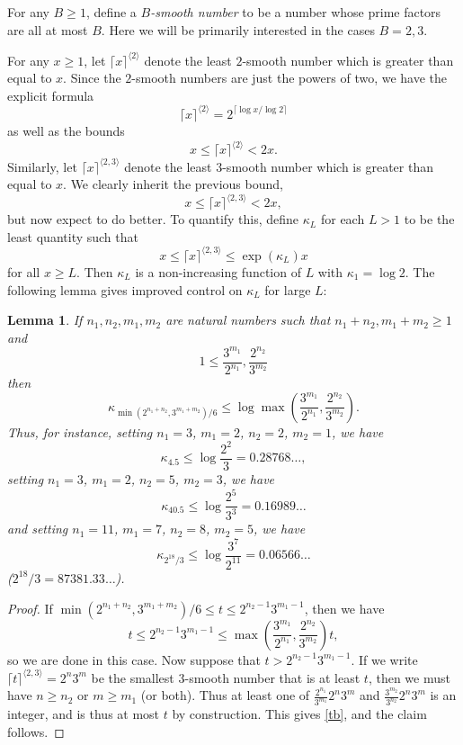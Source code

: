 \documentclass[12pt,a4paper,reqno]{amsart}
\numberwithin{equation}{section}
\theoremstyle{plain}
\newtheorem{lemma}[theorem]{Lemma}
\theoremstyle{definition}
\begin{document}
For any $B \geq 1$, define a \emph{$B$-smooth number} to be a number whose prime factors are all at most $B$.  Here we will be primarily interested in the cases $B=2,3$.

For any $x \geq 1$, let $\lceil x \rceil^{\langle 2\rangle}$ denote the least $2$-smooth number which is greater than equal to $x$.  Since the $2$-smooth numbers are just the powers of two, we have the explicit formula
$$\lceil x \rceil^{\langle 2\rangle} = 2^{\lceil \log x/\log 2 \rceil}$$
as well as the bounds
$$ x \leq \lceil x \rceil^{\langle 2\rangle}  < 2x.$$
Similarly, let $\lceil x \rceil^{\langle 2,3\rangle}$ denote the least $3$-smooth number which is greater than equal to $x$.  We clearly inherit the previous bound,
$$ x \leq \lceil x \rceil^{\langle 2,3\rangle}  < 2x,$$
but now expect to do better.  To quantify this, define $\kappa_L$ for each $L > 1$ to be the least quantity such that
\begin{equation}\label{kappa-def}  
  x \leq \lceil x \rceil^{\langle 2,3\rangle} \leq \exp(\kappa_L) x 
\end{equation}
for all $x \geq L$.  Then $\kappa_L$ is a non-increasing function of $L$ with $\kappa_1 = \log 2$.  The following lemma gives improved control on $\kappa_L$ for large $L$:

\begin{lemma}\label{lemcount-0}  If $n_1,n_2,m_1,m_2$ are natural numbers such that $n_1+n_2, m_1+m_2 \geq 1$ and
$$ 1 \leq \frac{3^{m_1}}{2^{n_1}}, \frac{2^{n_2}}{3^{m_2}}$$
then
$$ \kappa_{\min( 2^{n_1+n_2},3^{m_1+m_2})/6} \leq \log \max\left(\frac{3^{m_1}}{2^{n_1}}, \frac{2^{n_2}}{3^{m_2}}\right).$$
Thus, for instance, setting $n_1=3$, $m_1=2$, $n_2=2$, $m_2=1$, we have
$$ \kappa_{4.5} \leq \log \frac{2^2}{3} = 0.28768\dots,$$
setting $n_1 = 3$, $m_1 = 2$, $n_2 = 5$, $m_2 = 3$, we have
$$\kappa_{40.5} \leq \log \frac{2^5}{3^3} = 0.16989\dots$$ 
and setting $n_1 = 11$, $m_1 = 7$, $n_2 = 8$, $m_2 = 5$, we have 
$$\kappa_{2^{18}/3} \leq \log \frac{3^7}{2^{11}} = 0.06566\dots$$
($2^{18}/3 = 87381.33\dots$).
\end{lemma}

\begin{proof}  If $\min( 2^{n_1+n_2},3^{m_1+m_2})/6 \leq t \leq 2^{n_2-1} 3^{m_1-1}$, then we have
\begin{equation}\label{tb} 
  t \leq 2^{n_2-1} 3^{m_1-1} \leq \max\left(\frac{3^{m_1}}{2^{n_1}}, \frac{2^{n_2}}{3^{m_2}}\right) t,
\end{equation}
so we are done in this case.  Now suppose that $t > 2^{n_2-1} 3^{m_1-1}$.
If we write $\lceil t \rceil^{\langle 2,3 \rangle} =2^n 3^m$ be the smallest $3$-smooth number that is at least $t$, then we must have $n \geq n_2$ or $m \geq m_1$ (or both).  Thus at least one of $\frac{2^{n_1}}{3^{m_1}} 2^n 3^m$ and $\frac{3^{m_2}}{3^{n_2}} 2^n 3^m$ is an integer, and is thus at most $t$ by construction.  This gives \eqref{tb}, and the claim follows.
\end{proof}
\end{document}
